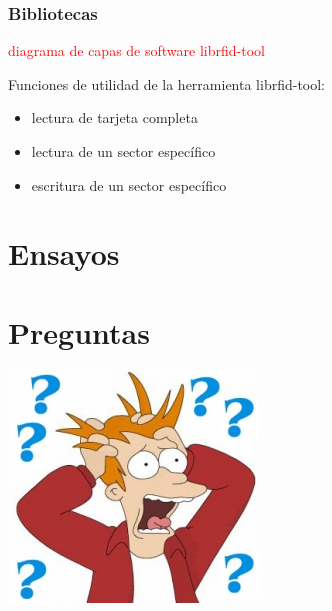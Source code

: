 \documentclass{beamer}
\begin{document}
\begin{frame}
	\frametitle{Bibliotecas}
	\textcolor{red}{diagrama de capas de software librfid-tool}

	Funciones de utilidad de la herramienta librfid-tool:
	\begin{itemize}
		\item lectura de tarjeta completa
		\item lectura de un sector específico
		\item escritura de un sector específico
	\end{itemize}
\end{frame}

\section{Ensayos}




\section{Preguntas}
\begin{frame}
	\begin{center}
		\bigskip		
		\includegraphics[scale=.5]{Imagenes/preg.jpg}
	\end{center}
\end{frame}
\end{document}

